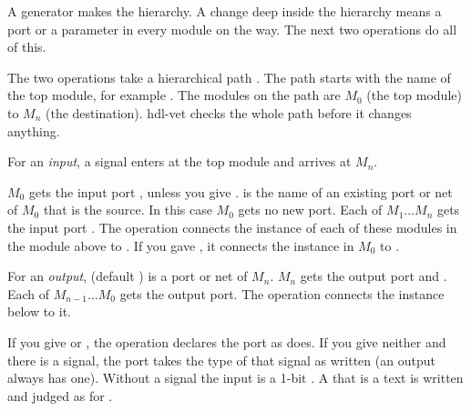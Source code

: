 A generator makes the hierarchy. A change deep inside the hierarchy means a port or a
parameter in every module on the way. The next two operations do all of this.

The two operations take a hierarchical path . The path starts with the name of
the top module, for example . The modules on the path are
$M_0$ (the top module) to $M_n$ (the destination). hdl-vet checks the whole path
before it changes anything.

\begin{entry}{}
\item[Writes] For an \emph{input}, a signal enters at the top module and arrives at
  $M_n$.

  $M_0$ gets the input port , unless you give .  is
  the name of an existing port or net of $M_0$ that is the source. In this case $M_0$
  gets no new port. Each of $M_1\ldots M_n$ gets the input port . The
  operation connects the instance of each of these modules in the module above to
  . If you gave , it connects the instance in $M_0$ to
  .

  For an \emph{output},  (default ) is a port or net of $M_n$.
  $M_n$ gets the output port  and . Each of
  $M_{n-1}\ldots M_0$ gets the output port. The operation connects the instance below to
  it.

  If you give  or , the operation declares the port as
   does. If you give neither and there is a signal, the port
  takes the type of that signal as written (an output always has one). Without a signal
  the input is a 1-bit . A  that is a text is written and judged as for
  .


\end{entry}
